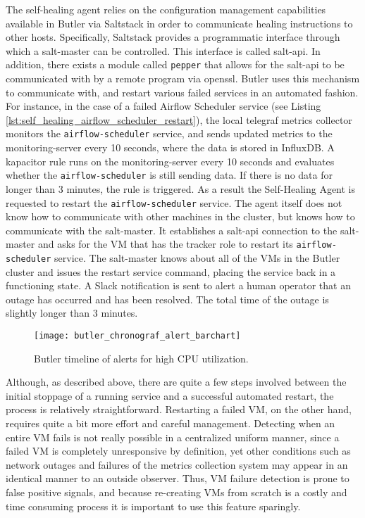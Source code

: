 The self-healing agent relies on the configuration management capabilities available in Butler via Saltstack in order to communicate healing instructions to other hosts. Specifically, Saltstack provides a programmatic interface through which a salt-master can be controlled. This interface is called salt-api. In addition, there exists a module called \texttt{pepper} that allows for the salt-api to be communicated with by a remote program via openssl. Butler uses this mechanism to communicate with, and restart various failed services in an automated fashion. For instance, in the case of a failed Airflow Scheduler service (see Listing \ref{lst:self_healing_airflow_scheduler_restart}), the local telegraf metrics collector monitors the \texttt{airflow-scheduler} service, and sends updated metrics to the monitoring-server every 10 seconds, where the data is stored in InfluxDB. A kapacitor rule runs on the monitoring-server every 10 seconds and evaluates whether the \texttt{airflow-scheduler} is still sending data. If there is no data for longer than 3 minutes, the rule is triggered. As a result the Self-Healing Agent is requested to restart the \texttt{airflow-scheduler} service. The agent itself does not know how to communicate with other machines in the cluster, but knows how to communicate with the salt-master. It establishes a salt-api connection to the salt-master and asks for the VM that has the tracker role to restart its \texttt{airflow-scheduler} service. The salt-master knows about all of the VMs in the Butler cluster and issues the restart service command, placing the service back in a functioning state. A Slack notification is sent to alert a human operator that an outage has occurred and has been resolved. The total time of the outage is slightly longer than 3 minutes.

\begin{figure}[h]
    \texttt{[image: butler\_chronograf\_alert\_barchart]}
    \centering
    \caption {Butler timeline of alerts for high CPU utilization.}
    \label{fig:butler_chronograf_alert_barchart}
\end{figure} 

Although, as described above, there are quite a few steps involved between the initial stoppage of a running service and a successful automated restart, the process is relatively straightforward. Restarting a failed VM, on the other hand, requires quite a bit more effort and careful management. Detecting when an entire VM fails is not really possible in a centralized uniform manner, since a failed VM is completely unresponsive by definition, yet other conditions such as network outages and failures of the metrics collection system may appear in an identical manner to an outside observer. Thus, VM failure detection is prone to false positive signals, and because re-creating VMs from scratch is a costly and time consuming process it is important to use this feature sparingly.

